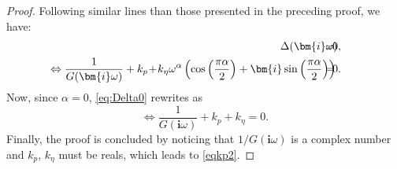 \documentclass[twoside,reqno,11pt]{fcaa-var} %
\begin{document}
\begin{proof}
	Following similar lines than those presented in the preceding proof, we have:
	\begin{eqnarray}
	\Delta(\bm{i}\omega)\!\!\!\!\!\!\!\!&=&\!\!\!\!\!\!\!0,\notag\\
	\!\!\!\!\!\!\!\!\!\!\Leftrightarrow\frac{1}{G(\bm{i}\omega)}+k_p\!+\!k_\eta\omega^\alpha\left(\cos \left(\frac{\pi  \alpha}{2}\right)+\bm{i} \sin \left(\frac{\pi  \alpha}{2}\right)\right)\!\!\!\!\!\!\!&=&\!\!\!\!\!\!\!0.\label{eq:Delta0}
	\end{eqnarray}
	Now, since $\alpha=0$, \eqref{eq:Delta0} rewrites as
	\begin{equation}
	\!\!\!\!\!\!\!\!\!\!\Leftrightarrow\frac{1}{G(\bm{i}\omega)}+k_p\!+\!k_\eta=0.\label{eq:Delta0a}
	\end{equation}
	Finally, the proof is concluded by noticing that $1/G(\bm{i}\omega)$ is a complex number and $k_p$, $k_\eta$ must be reals, which leads to \eqref{eqkp2}.
\end{proof}
\end{document}
